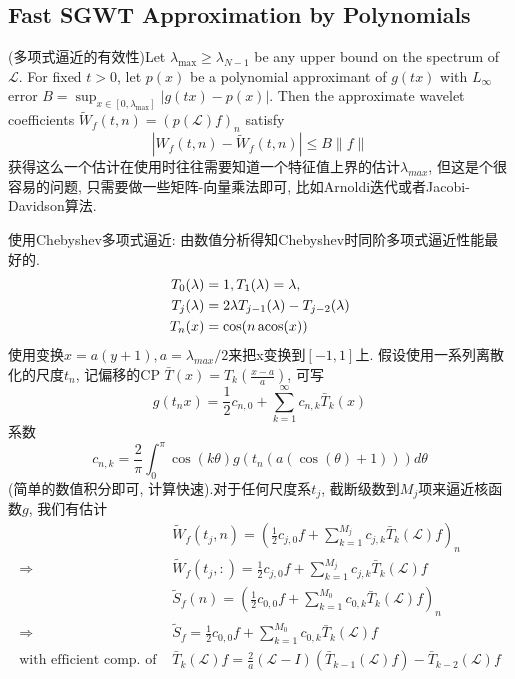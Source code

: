 \documentclass{article}
\begin{document}
\subsection{Fast SGWT Approximation by Polynomials}

    
     (多项式逼近的有效性)Let $\lambda_{\max } \geqslant \lambda_{N-1}$ be any upper bound on the spectrum of $\mathcal{L}$. For fixed $t>0$, let $p(x)$ be a polynomial approximant of $g(t x)$ with $L_{\infty}$ error $B=\sup _{x \in\left[0, \lambda_{\max }\right]}|g(t x)-p(x)| .$ Then the approximate wavelet coefficients $\tilde{W}_{f}(t, n)=(p(\mathcal{L}) f)_{n}$ satisfy
    $$
    \left|W_{f}(t, n)-\tilde{W}_{f}(t, n)\right| \leqslant B\|f\|
    $$
    获得这么一个估计在使用时往往需要知道一个特征值上界的估计$\lambda_{max}$, 但这是个很容易的问题, 只需要做一些矩阵-向量乘法即可, 比如Arnoldi迭代或者Jacobi-Davidson算法.

    使用Chebyshev多项式逼近: 由数值分析得知Chebyshev时同阶多项式逼近性能最好的.
    \begin{align}
        T_0(\lambda)&=1,
        T_1(\lambda)=\lambda,\\
        T_j(\lambda)&=2\lambda T_{j-1}(\lambda)-T_{j-2}(\lambda)\\
        T_n(x)&=\cos(n \acos(x))
    \end{align}
    使用变换$x=a(y+1),a=\lambda_{max}/2$来把x变换到$[-1, 1]$上. 假设使用一系列离散化的尺度$t_n$, 记偏移的CP $\bar T(x)=T_{k}\left(\frac{x-a}{a}\right)$, 可写
    \begin{equation}
        g\left(t_{n} x\right)=\frac{1}{2} c_{n, 0}+\sum_{k=1}^{\infty} c_{n, k} \bar{T}_{k}(x)
    \end{equation}
    系数
    \begin{equation}
        c_{n, k}=\frac{2}{\pi} \int_{0}^{\pi} \cos (k \theta) g\left(t_{n}(a(\cos (\theta)+1))\right) d \theta
    \end{equation}
    (简单的数值积分即可, 计算快速).对于任何尺度系$t_j$, 截断级数到$M_j$项来逼近核函数$g$, 我们有估计
    \begin{align}
        &\tilde{W}_{f}\left(t_{j}, n\right)=\left(\frac{1}{2} c_{j, 0} f+\sum_{k=1}^{M_{j}} c_{j, k} \bar{T}_{k}(\mathcal{L}) f\right)_{n}\\
        \Rightarrow& \tilde{W}_{f}\left(t_{j},\colon\right)=\frac{1}{2} c_{j, 0} f+\sum_{k=1}^{M_{j}} c_{j, k} \bar{T}_{k}(\mathcal{L}) f\\
        &\tilde{S}_{f}(n)=\left(\frac{1}{2} c_{0,0} f+\sum_{k=1}^{M_{0}} c_{0, k} \bar{T}_{k}(\mathcal{L}) f\right)_{n}\\
        \Rightarrow&
        \tilde{S}_{f}=\frac{1}{2} c_{0,0} f+\sum_{k=1}^{M_{0}} c_{0, k} \bar{T}_{k}(\mathcal{L}) f\\
        \text{with efficient comp. of } &\bar{T}_{k}(\mathcal{L}) f=\frac{2}{a}(\mathcal{L}-I)\left(\bar{T}_{k-1}(\mathcal{L}) f\right)-\bar{T}_{k-2}(\mathcal{L}) f
    \end{align}
\end{document}
